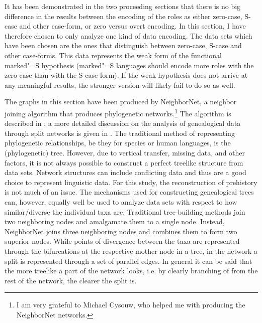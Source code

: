 It has been demonstrated in the two proceeding sections that there is no big difference in the
results between the encoding of the roles as either zero-case, S-case and other case-form, or zero
versus overt encoding.
In this section, I have therefore chosen to only analyze one kind of data encoding. 
The data sets which have been chosen are the ones that distinguish between zero-case, S-case and other case-forms. 
This data represents the weak form of the functional marked"=S hypothesis (marked"=S languages should encode more roles with the zero-case than with the S-case-form). 
If the weak hypothesis does not arrive at any meaningful results, the stronger version will likely fail to do so as well. 

The graphs in this section have been produced by NeighborNet, a neighbor joining algorithm that produces phylogenetic networks.\footnote{I am very grateful to Michael Cysouw, who helped me with producing the NeighborNet networks.} 
The algorithm is described in \citet{NeighborNet}; a more detailed discussion on the analysis of genealogical data through split networks is given in \citet{NeighborNetApplication}.  
The traditional method of representing phylogenetic relationships, be they for species or human languages, is the (phylogenetic) tree.
However, due to vertical transfer, missing data, and other factors, it is not always possible to construct a perfect treelike structure from data sets.
Network structures can include conflicting data and thus are a good choice to represent linguistic data.
For this study, the reconstruction of prehistory is not much of an issue.
The mechanisms used for constructing genealogical trees can, however, equally well be used to analyze data sets with respect to how similar/diverse the individual taxa are.  
Traditional tree-building methods join two neighboring nodes and amalgamate them to a single node.
Instead, NeighborNet joins three neighboring nodes and combines them to form two superior nodes.
While points of divergence between the taxa are represented through the bifurcations at the respective mother node in a tree, in the network a split is represented through a set of parallel edges. 
In general it can be said that the more treelike a part of the network looks, i.e. by clearly branching of from the rest of the network, the clearer the split is.  


